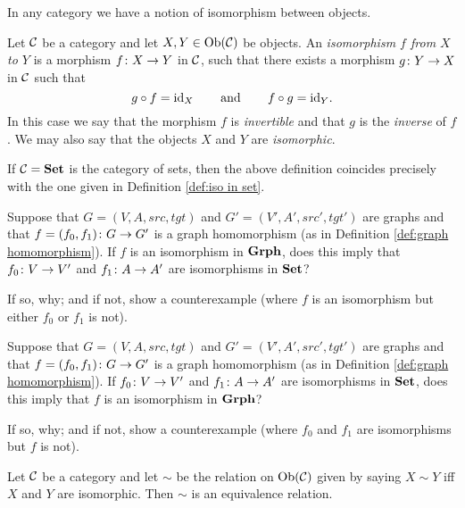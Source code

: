 In any category we have a notion of isomorphism between objects.

\begin{definition}

Let $\mathcal{C}$ be a category and let $X,Y\in\textnormal{Ob}(\mathcal{C})$ be objects. An {\em isomorphism $f$ from $X$ to $Y$} is a morphism $f\colon X\rightarrow Y$ in $\mathcal{C}$, such that there exists a morphism $g\colon Y\rightarrow X$ in $\mathcal{C}$ such that $$g\circ f=\textnormal{id}_X\hspace{.3in}\textnormal{and}\hspace{.3in} f\circ g=\textnormal{id}_Y.$$ In this case we say that the morphism $f$ is {\em invertible} and that $g$ is the {\em inverse} of $f$. We may also say that the objects $X$ and $Y$ are {\em isomorphic}.

\end{definition}

\begin{example}

If $\mathcal{C}={\bf Set}$ is the category of sets, then the above definition coincides precisely with the one given in Definition \ref{def:iso in set}.

\end{example}

\begin{exercise}
Suppose that $G=(V,A,src,tgt)$ and $G'=(V',A',src',tgt')$ are graphs and that $f=(f_0,f_1)\colon G\rightarrow G'$ is a graph homomorphism (as in Definition \ref{def:graph homomorphism}). 
\sexc If $f$ is an isomorphism in ${\bf Grph}$, does this imply that $f_0\colon V\rightarrow V'$ and $f_1\colon A\rightarrow A'$ are isomorphisms in ${\bf Set}$?
\item  If so, why; and if not, show a counterexample (where $f$ is an isomorphism but either $f_0$ or $f_1$ is not).
\endsexc
\end{exercise}

\begin{exercise}
Suppose that $G=(V,A,src,tgt)$ and $G'=(V',A',src',tgt')$ are graphs and that $f=(f_0,f_1)\colon G\rightarrow G'$ is a graph homomorphism (as in Definition \ref{def:graph homomorphism}). 
\sexc If $f_0\colon V\rightarrow V'$ and $f_1\colon A\rightarrow A'$ are isomorphisms in ${\bf Set}$, does this imply that $f$ is an isomorphism in ${\bf Grph}$?
\item If so, why; and if not, show a counterexample (where $f_0$ and $f_1$ are isomorphisms but $f$ is not).
\endsexc
\end{exercise}

\begin{lemma}\label{lemma:isomorphic ER}

Let $\mathcal{C}$ be a category and let $\sim$ be the relation on $\textnormal{Ob}(\mathcal{C})$ given by saying $X\sim Y$ iff $X$ and $Y$ are isomorphic. Then $\sim$ is an equivalence relation.

\end{lemma}

